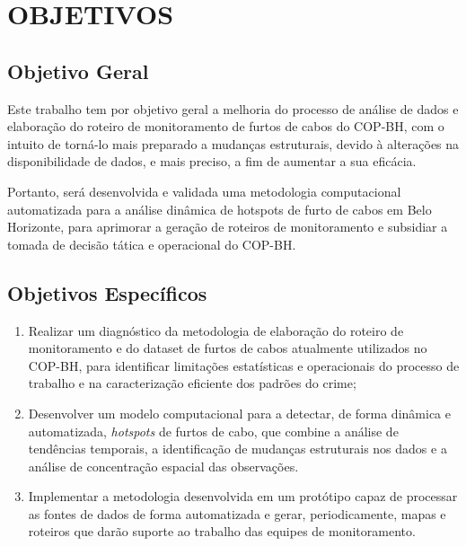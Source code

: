 \section{OBJETIVOS}
\label{sec:objetivos}

\subsection{Objetivo Geral}
\label{subsec:objgeral}
Este trabalho tem por objetivo geral a melhoria do processo de análise de dados e elaboração do roteiro de monitoramento de furtos de cabos do COP-BH, com o intuito de torná-lo mais preparado a mudanças estruturais, devido à alterações na disponibilidade de dados, e mais preciso, a fim de aumentar a sua eficácia.

Portanto, será desenvolvida e validada uma metodologia computacional automatizada para a análise dinâmica de hotspots de furto de cabos em Belo Horizonte, para aprimorar a geração de roteiros de monitoramento e subsidiar a tomada de decisão tática e operacional do COP-BH.

\subsection{Objetivos Específicos}
\label{subsec:objespc}
\begin{enumerate}
  \item{Realizar um diagnóstico da metodologia de elaboração do roteiro de monitoramento e do dataset de furtos de cabos atualmente utilizados no COP-BH, para identificar limitações estatísticas e operacionais do processo de trabalho e na caracterização eficiente dos padrões do crime;}
  \item{Desenvolver um modelo computacional para a detectar, de forma dinâmica e automatizada, \textit{hotspots} de furtos de cabo, que combine a análise de tendências temporais, a identificação de mudanças estruturais nos dados e a análise de concentração espacial das observações.}
  \item{Implementar a metodologia desenvolvida em um protótipo capaz de processar as fontes de dados de forma automatizada e gerar, periodicamente, mapas e roteiros que darão suporte ao trabalho das equipes de monitoramento.}
\end{enumerate}

